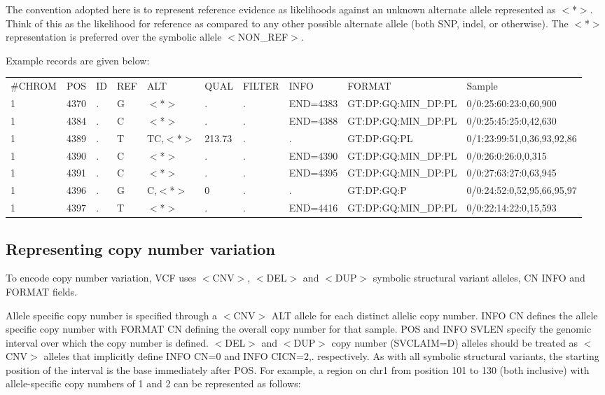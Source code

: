 \documentclass[8pt]{article}
\begin{document}
The convention adopted here is to represent reference evidence as likelihoods against an unknown alternate allele represented as $<$*$>$.
Think of this as the likelihood for reference as compared to any other possible alternate allele (both SNP, indel, or otherwise).
The $<$*$>$ representation is preferred over the symbolic allele $<$NON\_REF$>$.

Example records are given below:
\scriptsize
\begin{flushleft}
\begin{tabular}{ l l l l l l l l l l }
\#CHROM & POS & ID & REF & ALT & QUAL & FILTER & INFO & FORMAT & Sample \\
1 & 4370 & . & G & $<$*$>$ & . & . & END=4383 & GT:DP:GQ:MIN\_DP:PL & 0/0:25:60:23:0,60,900 \\
1 & 4384 & . & C & $<$*$>$ & . & . & END=4388 & GT:DP:GQ:MIN\_DP:PL & 0/0:25:45:25:0,42,630 \\
1 & 4389 & . & T & TC,$<$*$>$ & 213.73 & . & . & GT:DP:GQ:PL & 0/1:23:99:51,0,36,93,92,86 \\
1 & 4390 & . & C & $<$*$>$ & . & . & END=4390 & GT:DP:GQ:MIN\_DP:PL & 0/0:26:0:26:0,0,315 \\
1 & 4391 & . & C & $<$*$>$ & . & . & END=4395 & GT:DP:GQ:MIN\_DP:PL & 0/0:27:63:27:0,63,945 \\
1 & 4396 & . & G & C,$<$*$>$ & 0 & . & . & GT:DP:GQ:P & 0/0:24:52:0,52,95,66,95,97 \\
1 & 4397 & . & T & $<$*$>$ & . & . & END=4416 & GT:DP:GQ:MIN\_DP:PL & 0/0:22:14:22:0,15,593 \\
\end{tabular}
\end{flushleft}
\normalsize


\pagebreak
\subsection{Representing copy number variation}
\label{cnv}

To encode copy number variation, VCF uses $<$CNV$>$, $<$DEL$>$ and $<$DUP$>$ symbolic structural variant alleles, CN INFO and FORMAT fields.

Allele specific copy number is specified through a $<$CNV$>$ ALT allele for each distinct allelic copy number.
INFO CN defines the allele specific copy number with FORMAT CN defining the overall copy number for that sample.
POS and INFO SVLEN specify the genomic interval over which the copy number is defined.
$<$DEL$>$ and $<$DUP$>$ copy number (SVCLAIM=D) alleles should be treated as $<$CNV$>$ alleles that implicitly define INFO CN=0 and INFO CICN=2,. respectively.
As with all symbolic structural variants, the starting position of the interval is the base immediately after POS.
For example, a region on chr1 from position 101 to 130 (both inclusive) with allele-specific copy numbers of 1 and 2 can be represented as follows:
\end{document}
